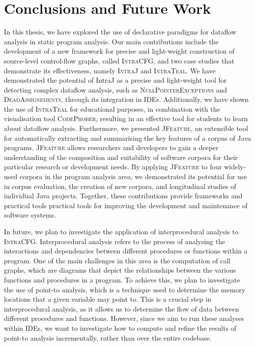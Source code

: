 \section{Conclusions and Future Work}%
\label{sec:kappa:conclusions}%
In this thesis, we have explored the use of declarative paradigms for
dataflow analysis in static program analysis. Our main contributions include the
development of a new framework for precise and light-weight construction of source-level
control-flow graphs, called \textsc{IntraCFG}, and two case studies that demonstrate
its effectiveness, namely \textsc{IntraJ} and \textsc{IntraTeal}.
We have demonstrated the potential of IntraJ as a precise and light-weight tool
for detecting complex dataflow analysis, such as \textsc{NullPointerExceptions} and \textsc{DeadAssignements},
through its integration in IDEs. Additionally, we have shown the use of \textsc{IntraTeal}
for educational purposes, in combination with the visualisation tool \textsc{CodeProber},
resulting in an effective tool for students to learn about dataflow analysis.
Furthermore, we presented  \textsc{JFeature}, an extensible tool for automatically
extracting and summarising the key features of a corpus of Java programs.
\textsc{JFeature} allows researchers and developers to gain a deeper understanding of the composition and
suitability of software corpora for their particular research or development needs.
By applying \textsc{JFeature} to four widely-used corpora in the program analysis area,
we demonstrated its potential for use in corpus evaluation, the creation of new
corpora, and longitudinal studies of individual Java projects.
Together, these contributions provide frameworks and practical tools practical tools
for improving the development and maintenance of software systems.


In future, we plan to investigate the application of interprocedural analysis
to \textsc{IntraCFG}. Interprocedural analysis refers to the process of analysing
the interactions and dependencies between different procedures or functions within a
program. One of the main challenges in this area is the computation of call graphs,
which are diagrams that depict the relationships between the various functions and
procedures in a program.
To achieve this, we plan to investigate the use of point-to analysis, which is a
technique used to determine the memory locations that a given variable may point to.
This is a crucial step in interprocedural analysis, as it allows us to determine
the flow of data between different procedures and functions. However, since we aim
to run these analyses within IDEs, we want to investigate how to compute and refine
the results of point-to analysis incrementally, rather than over the entire codebase.

